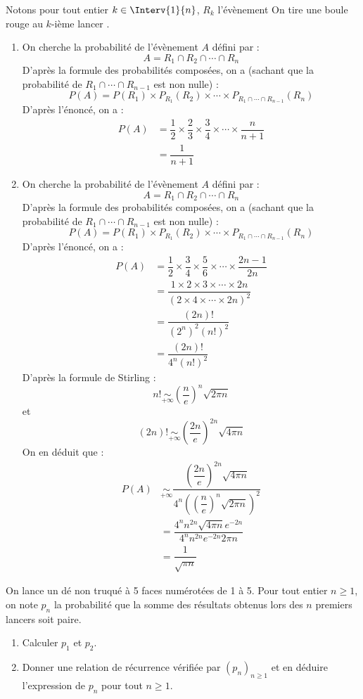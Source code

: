 \documentclass[a4paper,10pt]{report}
\begin{document}
\corr Notons pour tout entier $k \in \Interv{1}{n}$, $R_k$ l'évènement \og On tire une boule rouge au $k$-ième lancer \fg.

\begin{enumerate}
\item On cherche la probabilité de l'évènement $A$ défini par :
$$ A = R_1 \cap R_2 \cap \cdots \cap R_n$$
D'après la formule des probabilités composées, on a (sachant que la probabilité de $R_1 \cap \cdots \cap R_{n-1}$ est non nulle) :
$$ P(A) = P(R_1) \times P_{R_1}(R_2) \times \cdots \times P_{R_1 \cap \cdots \cap R_{n-1}}(R_n)$$
D'après l'énoncé, on a :
\begin{align*}
P(A) & = \dfrac{1}{2} \times \dfrac{2}{3} \times \dfrac{3}{4} \times \cdots \times \dfrac{n}{n+1} \\
& = \dfrac{1}{n+1}
\end{align*}
\item On cherche la probabilité de l'évènement $A$ défini par :
$$ A = R_1 \cap R_2 \cap \cdots \cap R_n$$
D'après la formule des probabilités composées, on a (sachant que la probabilité de $R_1 \cap \cdots \cap R_{n-1}$ est non nulle) :
$$ P(A) = P(R_1) \times P_{R_1}(R_2) \times \cdots \times P_{R_1 \cap \cdots \cap R_{n-1}}(R_n)$$
D'après l'énoncé, on a :
\begin{align*}
P(A) & = \dfrac{1}{2} \times \dfrac{3}{4} \times \dfrac{5}{6} \times \cdots \times \dfrac{2n-1}{2n} \\
& = \dfrac{1 \times 2 \times 3 \times \cdots \times 2n}{(2 \times 4 \times \cdots \times 2n)^2} \\
& = \dfrac{(2n)!}{(2^n)^2 (n!)^2} \\
&= \dfrac{(2n)!}{4^n (n!)^2}
\end{align*}
D'après la formule de Stirling :
$$ n! \underset{+ \infty}{\sim} \left(\dfrac{n}{e} \right)^n \sqrt{2 \pi n}$$
et 
$$ (2n)! \underset{+ \infty}{\sim} \left(\dfrac{2n}{e} \right)^{2n} \sqrt{4 \pi n}$$
On en déduit que :
\begin{align*}
P(A) & \underset{+ \infty}{\sim} \dfrac{\left(\dfrac{2n}{e} \right)^{2n} \sqrt{4 \pi n}}{4^n \left(\left(\dfrac{n}{e} \right)^n \sqrt{2 \pi n}\right)^2} \\
& = \dfrac{4^n n^{2n} \sqrt{4 \pi n} e^{-2n}}{4^n n^{2n} e^{-2n}2\pi n} \\
& = \dfrac{1}{\sqrt{\pi n}}
\end{align*}
\end{enumerate}

\begin{Exercice}{} On lance un dé non truqué à 5 faces numérotées de 1 à 5. Pour tout entier $n \geq 1$, on note $p_n$ la probabilité que la somme des résultats obtenus lors des $n$ premiers lancers soit paire. 
\begin{enumerate}
\item Calculer $p_1$ et $p_2$.
\item Donner une relation de récurrence vérifiée par $(p_n)_{n \geq 1}$ et en déduire l'expression de $p_n$ pour tout $n \geq 1$.
\end{enumerate}
\end{Exercice}
\end{document}
